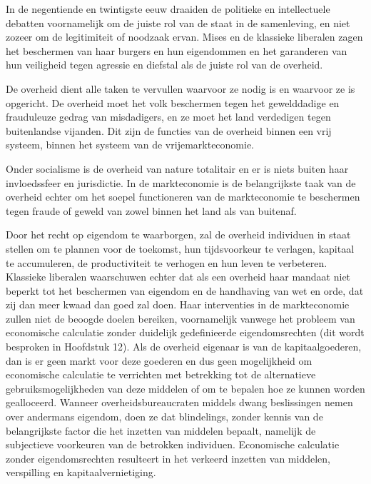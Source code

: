 In de negentiende en twintigste eeuw draaiden de politieke en intellectuele debatten voornamelijk om de juiste rol van de staat in de samenleving, en niet zozeer om de legitimiteit of noodzaak ervan. Mises en de klassieke liberalen zagen het beschermen van haar burgers en hun eigendommen en het garanderen van hun veiligheid tegen agressie en diefstal als de juiste rol van de overheid.

\begin{blockquotebox}
    De overheid dient alle taken te vervullen waarvoor ze nodig is en waarvoor ze is opgericht. De overheid moet het volk beschermen tegen het gewelddadige en frauduleuze gedrag van misdadigers, en ze moet het land verdedigen tegen buitenlandse vijanden. Dit zijn de functies van de overheid binnen een vrij systeem, binnen het systeem van de vrijemarkteconomie.
    \par\vspace{1em}\noindent
    Onder socialisme is de overheid van nature totalitair en er is niets buiten haar invloedssfeer en jurisdictie. In de markteconomie is de belangrijkste taak van de overheid echter om het soepel functioneren van de markteconomie te beschermen tegen fraude of geweld van zowel binnen het land als van buitenaf.\footnotemark
\end{blockquotebox}
\autocite{181}

Door het recht op eigendom te waarborgen, zal de overheid individuen in staat stellen om te plannen voor de toekomst, hun tijdsvoorkeur te verlagen, kapitaal te accumuleren, de productiviteit te verhogen en hun leven te verbeteren. Klassieke liberalen waarschuwen echter dat als een overheid haar mandaat niet beperkt tot het beschermen van eigendom en de handhaving van wet en orde, dat zij dan meer kwaad dan goed zal doen. Haar interventies in de markteconomie zullen niet de beoogde doelen bereiken, voornamelijk vanwege het probleem van economische calculatie zonder duidelijk gedefinieerde eigendomsrechten (dit wordt besproken in Hoofdstuk 12). Als de overheid eigenaar is van de kapitaalgoederen, dan is er geen markt voor deze goederen en dus geen mogelijkheid om economische calculatie te verrichten met betrekking tot de alternatieve gebruiksmogelijkheden van deze middelen of om te bepalen hoe ze kunnen worden gealloceerd. Wanneer overheidsbureaucraten middels dwang beslissingen nemen over andermans eigendom, doen ze dat blindelings, zonder kennis van de belangrijkste factor die het inzetten van middelen bepaalt, namelijk de subjectieve voorkeuren van de betrokken individuen. Economische calculatie zonder eigendomsrechten resulteert in het verkeerd inzetten van middelen, verspilling en kapitaalvernietiging.


